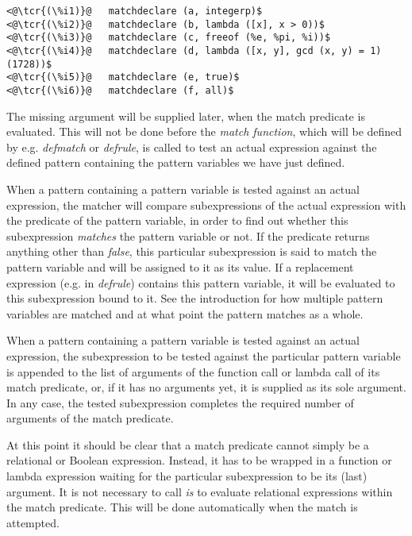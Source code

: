 \documentclass[../Maxima_Workbook.tex]{subfiles}
\begin{document}
\lz \begin{small}
\color{blue}
\begin{lstlisting}
<@\tcr{(\%i1)}@   matchdeclare (a, integerp)$
<@\tcr{(\%i2)}@   matchdeclare (b, lambda ([x], x > 0))$
<@\tcr{(\%i3)}@   matchdeclare (c, freeof (%e, %pi, %i))$
<@\tcr{(\%i4)}@   matchdeclare (d, lambda ([x, y], gcd (x, y) = 1) (1728))$
<@\tcr{(\%i5)}@   matchdeclare (e, true)$
<@\tcr{(\%i6)}@   matchdeclare (f, all)$
\end{lstlisting}
\color{black}
\end{small}

\lz The missing argument will be supplied later, when the match predicate is evaluated. This will not be done before the \emph{match function}, which will be defined by e.g. \emph{defmatch} or \emph{defrule}, is called to test an actual expression against the defined pattern containing the pattern variables we have just defined.

\lz When a pattern containing a pattern variable is tested against an actual expression, the matcher will compare subexpressions of the actual expression with the predicate of the pattern variable, in order to find out whether this subexpression \emph{matches} the pattern variable or not. If the predicate returns anything other than \emph{false}, this particular subexpression is said to match the pattern variable and will be assigned to it as its value. If a replacement expression (e.g. in \emph{defrule}) contains this pattern variable, it will be evaluated to this subexpression bound to it. See the introduction for how multiple pattern variables are matched and at what point the pattern matches as a whole.

\lz When a pattern containing a pattern variable is tested against an actual expression, the subexpression to be tested against the particular pattern variable is appended to the list of arguments of the function call or lambda call of its match predicate, or, if it has no arguments yet, it is supplied as its sole argument. In any case, the tested subexpression completes the required number of arguments of the match predicate. 

\lz At this point it should be clear that a match predicate cannot simply be a relational or Boolean expression. Instead, it has to be wrapped in a function or lambda expression waiting for the particular subexpression to be its (last) argument. It is not necessary to call \emph{is} to evaluate relational expressions within the match predicate. This will be done automatically when the match is attempted.
\end{document}
